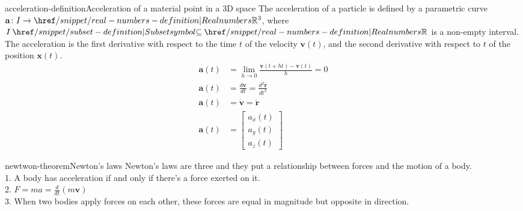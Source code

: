 \documentclass[preview]{standalone}
\begin{document}
\begin{snippetdefinition}{acceleration-definition}{Acceleration of a material point in a 3D space}
    The acceleration of a particle is defined by a parametric curve $\mathbf{a} \colon I \to \realnumbers^3 $, where $I \subseteq \realnumbers$ is a non-empty interval. \\
    The acceleration is the first derivative with respect to the time $t$ of the velocity $\mathbf{v}(t)$, and the second derivative with respect to $t$ of the position $\mathbf{x}(t)$.
    \begin{align*}
        \mathbf{a}(t) &= \lim_{h \to 0} \frac{\mathbf{v}(t + ht) - \mathbf{v}(t)}{h} = 0 \\
        \mathbf{a}(t) &= \frac{d\mathbf{v}}{dt} = \frac{d^2 \mathbf{r}}{dt^2} \\
        \mathbf{a}(t) &= \dot{\mathbf{v}} = \ddot{\mathbf{r}} \\
        \mathbf{a}(t) &= \begin{bmatrix}
            a_x(t) \\ a_y(t) \\ a_z(t)
        \end{bmatrix}
    \end{align*} 
\end{snippetdefinition}




\begin{snippettheorem}{newtwon-theorem}{Newton's laws}
    Newton's laws are three and they put a relationship between forces and the motion of a body. \\
    1. A body has acceleration if and only if there's a force exerted on it.  \\
    2. $F = ma = \frac{d}{dt}\left(m \mathbf{v} \right)$ \\
    3. When two bodies apply forces on each other, these forces are equal in magnitude but opposite in direction.
\end{snippettheorem}
\end{document}
